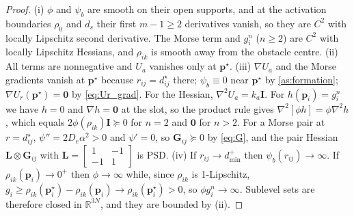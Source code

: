 \documentclass[11pt]{article}
\theoremstyle{definition}
\theoremstyle{remark}
\newcommand{\R}{\mathbb{R}}
\newcommand{\bp}{\mathbf{p}}
\newcommand{\bI}{\mathbf{I}}
\newcommand{\bG}{\mathbf{G}}
\newcommand{\bL}{\mathbf{L}}
\newcommand{\dmin}{d_{\min}}
\begin{document}
\begin{proof}
(i) $\phi$ and $\psi_b$ are smooth on their open supports, and at the
activation boundaries $\rho_0$ and $d_s$ their first $m-1\ge2$ derivatives
vanish, so they are $C^2$ with locally Lipschitz second derivative. The Morse
term and $g_i^n$ ($n\ge2$) are $C^2$ with locally Lipschitz Hessians, and
$\rho_{ik}$ is smooth away from the obstacle centre.
(ii) All terms are nonnegative and $U_a$ vanishes only at $\bp^\star$.
(iii) $\nabla U_a$ and the Morse gradients vanish at $\bp^\star$ because
$r_{ij}=d_{ij}^\star$ there; $\psi_b\equiv0$ near $\bp^\star$ by
\cref{as:formation}; $\nabla U_r(\bp^\star)=\mathbf{0}$ by \eqref{eq:Ur_grad}.
For the Hessian, $\nabla^2U_a=k_a\bI$. For $h(\bp_i)=g_i^n$ we have $h=0$ and
$\nabla h=\mathbf{0}$ at the slot, so the product rule gives
$\nabla^2[\phi h]=\phi\nabla^2h$, which equals $2\phi(\rho_{ik})\bI\succeq0$ for
$n=2$ and $\mathbf{0}$ for $n>2$. For a Morse pair at $r=d_{ij}^\star$,
$\psi''=2D_e\alpha^2>0$ and $\psi'=0$, so $\bG_{ij}\succeq0$ by \eqref{eq:G},
and the pair Hessian $\bL\otimes\bG_{ij}$ with $\bL=\left[\begin{smallmatrix}1&-1\\-1&1\end{smallmatrix}\right]$
is PSD.
(iv) If $r_{ij}\to\dmin^+$ then $\psi_b(r_{ij})\to\infty$. If
$\rho_{ik}(\bp_i)\to0^+$ then $\phi\to\infty$ while, since $\rho_{ik}$ is
1-Lipschitz, $g_i\ge\rho_{ik}(\bp_i^\star)-\rho_{ik}(\bp_i)\to\rho_{ik}(\bp_i^\star)>0$,
so $\phi g_i^n\to\infty$. Sublevel sets are therefore closed in $\R^{3N}$, and
they are bounded by (ii).
\end{proof}
\end{document}
